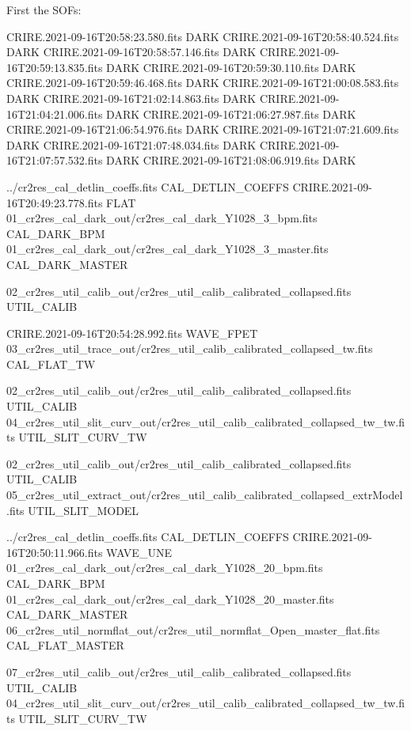 First the SOFs:
\begin{shell}[fontsize=\footnotesize]
CRIRE.2021-09-16T20:58:23.580.fits      DARK     
CRIRE.2021-09-16T20:58:40.524.fits      DARK     
CRIRE.2021-09-16T20:58:57.146.fits      DARK     
CRIRE.2021-09-16T20:59:13.835.fits      DARK     
CRIRE.2021-09-16T20:59:30.110.fits      DARK     
CRIRE.2021-09-16T20:59:46.468.fits      DARK     
CRIRE.2021-09-16T21:00:08.583.fits      DARK     
CRIRE.2021-09-16T21:02:14.863.fits      DARK     
CRIRE.2021-09-16T21:04:21.006.fits      DARK     
CRIRE.2021-09-16T21:06:27.987.fits      DARK     
CRIRE.2021-09-16T21:06:54.976.fits      DARK     
CRIRE.2021-09-16T21:07:21.609.fits      DARK     
CRIRE.2021-09-16T21:07:48.034.fits      DARK     
CRIRE.2021-09-16T21:07:57.532.fits      DARK     
CRIRE.2021-09-16T21:08:06.919.fits      DARK     

../cr2res_cal_detlin_coeffs.fits CAL_DETLIN_COEFFS
CRIRE.2021-09-16T20:49:23.778.fits      FLAT     
01_cr2res_cal_dark_out/cr2res_cal_dark_Y1028_3_bpm.fits CAL_DARK_BPM
01_cr2res_cal_dark_out/cr2res_cal_dark_Y1028_3_master.fits CAL_DARK_MASTER

02_cr2res_util_calib_out/cr2res_util_calib_calibrated_collapsed.fits    UTIL_CALIB

CRIRE.2021-09-16T20:54:28.992.fits      WAVE_FPET
03_cr2res_util_trace_out/cr2res_util_calib_calibrated_collapsed_tw.fits  CAL_FLAT_TW

02_cr2res_util_calib_out/cr2res_util_calib_calibrated_collapsed.fits UTIL_CALIB
04_cr2res_util_slit_curv_out/cr2res_util_calib_calibrated_collapsed_tw_tw.fits UTIL_SLIT_CURV_TW

02_cr2res_util_calib_out/cr2res_util_calib_calibrated_collapsed.fits UTIL_CALIB
05_cr2res_util_extract_out/cr2res_util_calib_calibrated_collapsed_extrModel.fits UTIL_SLIT_MODEL

../cr2res_cal_detlin_coeffs.fits CAL_DETLIN_COEFFS
CRIRE.2021-09-16T20:50:11.966.fits      WAVE_UNE 
01_cr2res_cal_dark_out/cr2res_cal_dark_Y1028_20_bpm.fits CAL_DARK_BPM
01_cr2res_cal_dark_out/cr2res_cal_dark_Y1028_20_master.fits CAL_DARK_MASTER
06_cr2res_util_normflat_out/cr2res_util_normflat_Open_master_flat.fits CAL_FLAT_MASTER

07_cr2res_util_calib_out/cr2res_util_calib_calibrated_collapsed.fits UTIL_CALIB
04_cr2res_util_slit_curv_out/cr2res_util_calib_calibrated_collapsed_tw_tw.fits UTIL_SLIT_CURV_TW


\end{shell}
